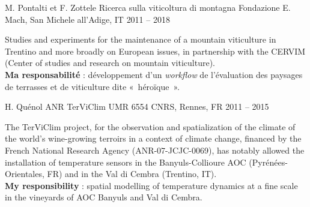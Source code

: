\begin{cventries}
\cventry
{M. Pontalti et F. Zottele} %
{Ricerca sulla viticoltura di montagna} %
{Fondazione E. Mach, San Michele all'Adige, IT} %
{2011 -- 2018} %
{
  \begin{cvitems} %
    Studies and experiments for the maintenance of a mountain viticulture in Trentino and more broadly on European issues, in partnership with the CERVIM (Center of studies and research on mountain viticulture).\\
    \textbf{Ma responsabilité} : développement d’un \emph{workflow} de l’évaluation des paysages de terrasses et de viticulture dite « héroïque ».
  \end{cvitems}
}

\cventry
{H. Quénol} %
{ANR TerViClim} %
{UMR 6554 CNRS, Rennes, FR} %
{2011 -- 2015} %
{
  \begin{cvitems} %
    The TerViClim project, for the observation and spatialization of the climate of the world's wine-growing terroirs in a context of climate change, financed by the French National Research Agency (ANR-07-JCJC-0069), has notably allowed the installation of temperature sensors in the Banyuls-Collioure AOC (Pyrénées-Orientales, FR) and in the Val di Cembra (Trentino, IT).\\
    \textbf{My responsibility} : spatial modelling of temperature dynamics at a fine scale in the vineyards of AOC Banyuls and Val di Cembra.
  \end{cvitems}
}


\end{cventries}
